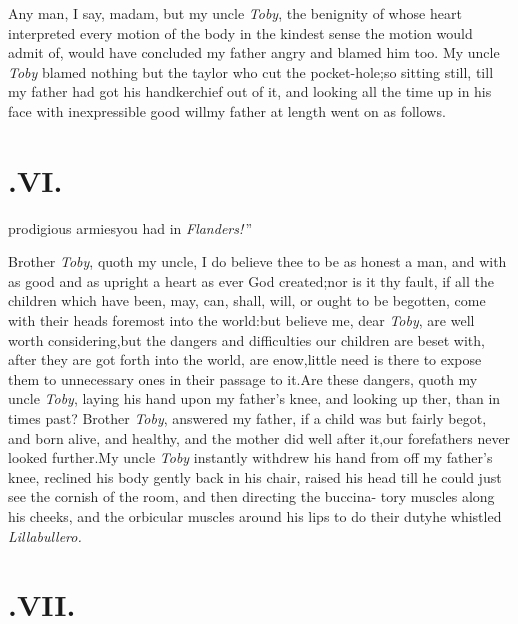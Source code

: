 \documentclass{article}
\begin{document}
Any man, I say, madam, but my uncle \textit{Toby}, the benignity of whose heart
interpreted every motion of the body in the kindest sense the motion would admit of,
would have concluded my father angry and blamed him too. My uncle \textit{Toby}
blamed nothing but the taylor who cut the pocket-hole;\tsh so sitting still, till
my father had got his handkerchief out of it, and looking all the time up in his face
with inexpressible good will\tsh my father at length went on as follows.

\section{.\quad  VI.}

prodigious armies\break you had in \textit{Flanders!}\,”

\tsh Brother \textit{Toby}, quoth my uncle, I do believe
thee to be as honest a man, and with as good and as upright a heart
as ever God created;\tsh nor is it thy fault, if all the children
which have been, may, can, shall, will, or ought to be begotten,
come with their heads foremost into the world:\tsh but
believe me, dear \textit{Toby},
are well worth considering,\tsh but the dangers and difficulties
our children are beset with, after they are got forth into the
world, are enow,\tsk little need is there to expose them to
unnecessary ones in their passage to it.\tsk Are these dangers,
quoth my uncle \textit{Toby}, laying his hand upon my father’s
knee, and looking up   ther, than in times past? Brother \textit{Toby}, answered
my father, if a child was but fairly begot, and born alive, and
healthy, and the mother did well after it,\tsk our forefathers
never looked further.\tsh My uncle \textit{Toby} instantly
withdrew his hand from off my father’s knee, reclined his body
gently back in his chair, raised his head till he could just see
the cornish of the room, and then directing the
buccina-\break
tory muscles along his cheeks, and the 
orbicular muscles around his lips to do their duty\tsk he
whistled \textit{Lillabullero.}

\section{.\quad  VII.}
\end{document}
